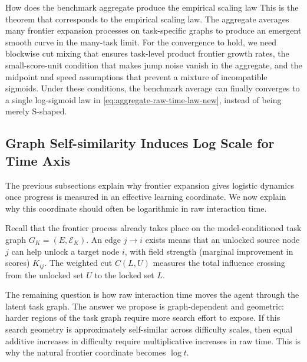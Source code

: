 \begin{readingbox}{How does the benchmark aggregate produce the empirical scaling law}
This is the theorem that corresponds to the empirical scaling law. The aggregate averages many frontier expansion processes on task-specific graphs to produce an emergent smooth curve in the many-task limit. For the convergence to hold, we need blockwise cut mixing that ensures task-level product frontier growth rates, the small-score-unit condition that makes jump noise vanish in the aggregate, and the midpoint and speed assumptions that prevent a mixture of incompatible sigmoids. Under these conditions, the benchmark average can finally converges to a single log-sigmoid law in \eqref{eq:aggregate-raw-time-law-new}, instead of being merely S-shaped.
\end{readingbox}


\subsection{Graph Self-similarity Induces Log Scale for Time Axis}
\label{subsec:self-similar-log-time}

The previous subsections explain why frontier expansion gives logistic dynamics once progress is measured in an effective learning coordinate. We now explain why this coordinate should often be logarithmic in raw interaction time.

Recall that the frontier process already takes place on the model-conditioned task graph \(G_K=(E,\mathcal E_K)\). An edge \(j\to i\) exists means that an unlocked source node \(j\) can help unlock a target node \(i\), with field strength (marginal improvement in scores) \(K_{ij}\). The weighted cut \(C(L,U)\) measures the total influence crossing from the unlocked set \(U\) to the locked set \(L\).

The remaining question is how raw interaction time moves the agent through the latent task graph. The answer we propose is graph-dependent and geometric: harder regions of the task graph require more search effort to expose. If this search geometry is approximately self-similar across difficulty scales, then equal additive increases in difficulty require multiplicative increases in raw time. This is why the natural frontier coordinate becomes \(\log t\).

